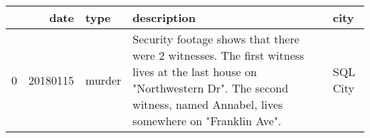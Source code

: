 \begin{tabular}{lrlll}
\toprule
 & date & type & description & city \\
\midrule
0 & 20180115 & murder & Security footage shows that there were 2 witnesses. The first witness lives at the last house on "Northwestern Dr". The second witness, named Annabel, lives somewhere on "Franklin Ave". & SQL City \\
\bottomrule
\end{tabular}
